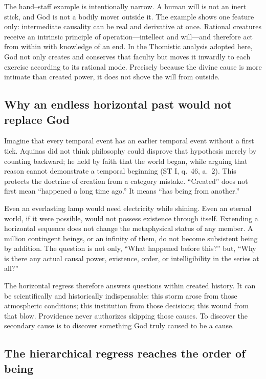 The hand--staff example is intentionally narrow. A human will is not an inert stick, and God is not a bodily mover outside it. The example shows one feature only: intermediate causality can be real and derivative at once. Rational creatures receive an intrinsic principle of operation---intellect and will---and therefore act from within with knowledge of an end. In the Thomistic analysis adopted here, God not only creates and conserves that faculty but moves it inwardly to each exercise according to its rational mode. Precisely because the divine cause is more intimate than created power, it does not shove the will from outside.

\subsection{Why an endless horizontal past would not replace God}

Imagine that every temporal event has an earlier temporal event without a first tick. Aquinas did not think philosophy could disprove that hypothesis merely by counting backward; he held by faith that the world began, while arguing that reason cannot demonstrate a temporal beginning (ST I, q.~46, a.~2). This protects the doctrine of creation from a category mistake. ``Created'' does not first mean ``happened a long time ago.'' It means ``has being from another.''

Even an everlasting lamp would need electricity while shining. Even an eternal world, if it were possible, would not possess existence through itself. Extending a horizontal sequence does not change the metaphysical status of any member. A million contingent beings, or an infinity of them, do not become subsistent being by addition. The question is not only, ``What happened before this?'' but, ``Why is there any actual causal power, existence, order, or intelligibility in the series at all?''

The horizontal regress therefore answers questions within created history. It can be scientifically and historically indispensable: this storm arose from those atmospheric conditions; this institution from those decisions; this wound from that blow. Providence never authorizes skipping those causes. To discover the secondary cause is to discover something God truly caused to be a cause.

\subsection{The hierarchical regress reaches the order of being}

